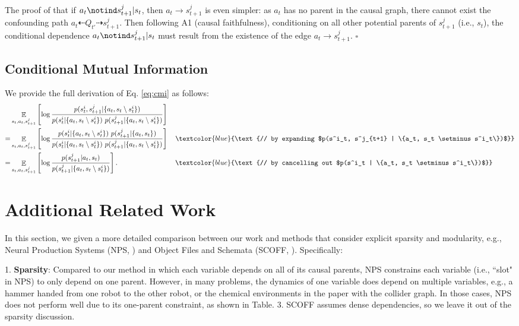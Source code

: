The proof of that if $a_t \notind s^j_{t+1} | s_t$, then $a_t \rightarrow s^j_{t+1}$ is even simpler: as $a_t$ has no parent in the causal graph, there cannot exist the confounding path $a_t \dashleftarrow Q_{t'} \dashrightarrow s_{t+1}^j$. Then following A1 (causal faithfulness), conditioning on all other potential parents of $s^j_{t+1}$ (i.e., $s_t$), the conditional dependence $a_t \notind s^j_{t+1} | s_t$ must result from the existence of the edge $a_t \rightarrow s^j_{t+1}$. \hfill$\square$

\subsection{Conditional Mutual Information}
\label{app:cmi_eq_derivation}

We provide the full derivation of Eq. \ref{eq:cmi} as follows:
\begin{align}
& \mathop{\mathbb{E}}\limits_{s_t,a_t,s^j_{t+1}}\left[\log\frac{p(s^i_t, s^j_{t+1} | \{a_t, s_t \setminus s^i_t\})}{p(s^i_t | \{a_t, s_t \setminus s^i_t\}) \ p(s^j_{t+1} | \{a_t, s_t \setminus s^i_t\})}\right] \nonumber\\
=& \mathop{\mathbb{E}}\limits_{s_t,a_t,s^j_{t+1}}\left[\log\frac{p(s^i_t | \{a_t, s_t \setminus s^i_t\}) \ p(s^j_{t+1} | \{a_t, s_t\})}{p(s^i_t | \{a_t, s_t \setminus s^i_t\}) \ p(s^j_{t+1} | \{a_t, s_t \setminus s^i_t\})}\right] 
\quad \textcolor{blue}{\text{// by expanding $p(s^i_t, s^j_{t+1} | \{a_t, s_t \setminus s^i_t\})$}}\nonumber\\
=& \mathop{\mathbb{E}}\limits_{s_t,a_t,s^j_{t+1}}\left[\log\frac{p(s^j_{t+1} | a_t, s_t)}{p(s^j_{t+1} | \{a_t, s_t \setminus s^i_t\})}\right].
\qquad \qquad \qquad \qquad \ \textcolor{blue}{\text{// by cancelling out $p(s^i_t | \{a_t, s_t \setminus s^i_t\})$}}\nonumber
\end{align}

\section{Additional Related Work}
\label{app:additional_related}

In this section, we given a more detailed comparison between our work and methods that consider explicit sparsity and modularity, e.g., Neural Production Systems (NPS, \citet{alias2021neural}) and Object Files and Schemata (SCOFF, \citet{goyal2020object}). Specifically:

1. \textbf{Sparsity}: Compared to our method in which each variable depends on all of its causal parents, NPS constrains each variable (i.e., ``slot" in NPS) to only depend on one parent. However, in many problems, the dynamics of one variable does depend on multiple variables, e.g., a hammer handed from one robot to the other robot, or the chemical environments in the paper with the collider graph. In those cases, NPS does not perform well due to its one-parent constraint, as shown in Table. 3. SCOFF assumes dense dependencies, so we leave it out of the sparsity discussion.

